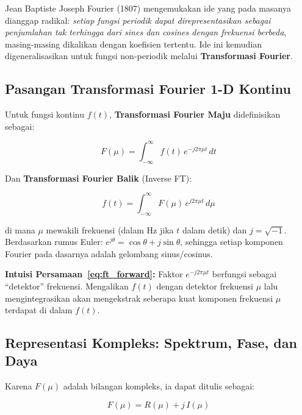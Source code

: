 \documentclass[12pt,a4paper]{article}
\begin{document}
Jean Baptiste Joseph Fourier (1807) mengemukakan ide yang pada masanya dianggap
radikal: \textit{setiap fungsi periodik dapat direpresentasikan sebagai penjumlahan
tak terhingga dari sines dan cosines dengan frekuensi berbeda}, masing-masing
dikalikan dengan koefisien tertentu. Ide ini kemudian digeneralisasikan untuk
fungsi non-periodik melalui \textbf{Transformasi Fourier}.

\subsection{Pasangan Transformasi Fourier 1-D Kontinu}

Untuk fungsi kontinu $f(t)$, \textbf{Transformasi Fourier Maju} didefinisikan sebagai:

\begin{equation}
  F(\mu) = \int_{-\infty}^{\infty} f(t)\, e^{-j2\pi\mu t}\, dt
  \label{eq:ft_forward}
\end{equation}

Dan \textbf{Transformasi Fourier Balik} (Inverse FT):

\begin{equation}
  f(t) = \int_{-\infty}^{\infty} F(\mu)\, e^{j2\pi\mu t}\, d\mu
  \label{eq:ft_inverse}
\end{equation}

di mana $\mu$ mewakili frekuensi (dalam Hz jika $t$ dalam detik) dan
$j = \sqrt{-1}$. Berdasarkan rumus Euler: $e^{j\theta} = \cos\theta + j\sin\theta$,
sehingga setiap komponen Fourier pada dasarnya adalah gelombang sinus/cosinus.

\begin{notebox}
\textbf{Intuisi Persamaan~\eqref{eq:ft_forward}:} Faktor $e^{-j2\pi\mu t}$
berfungsi sebagai ``detektor'' frekuensi. Mengalikan $f(t)$ dengan detektor
frekuensi $\mu$ lalu mengintegrasikan akan mengekstrak seberapa kuat komponen
frekuensi $\mu$ terdapat di dalam $f(t)$.
\end{notebox}

\subsection{Representasi Kompleks: Spektrum, Fase, dan Daya}

Karena $F(\mu)$ adalah bilangan kompleks, ia dapat ditulis sebagai:

\begin{equation}
  F(\mu) = R(\mu) + j\,I(\mu)
  \label{eq:ft_complex}
\end{equation}
\end{document}
